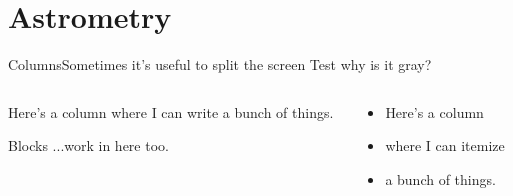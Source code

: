 \section{Astrometry}
\begin{frame}[c]{Columns}{Sometimes it's useful to split the screen}
	Test why is it gray?
	
	\begin{columns}[t]
	\begin{column}[T]{5cm}
		Here's a column where I can write a bunch of things. \\
		
		\vspace{1em}
		\begin{block}{Blocks}
			...work in here too.
		\end{block}
	\end{column}
	\begin{column}[T]{5cm}
		\begin{itemize}
			\item Here's a column
			\item where I can itemize
			\item a bunch of things.
		\end{itemize}
	\end{column}
	\end{columns}
	
\end{frame}


